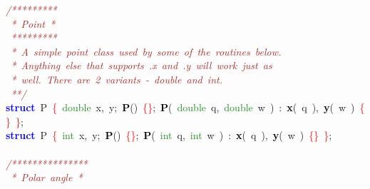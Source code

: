 
{\ttfamily \raggedright {
\noindent
\mbox{}\textit{\textcolor{Brown}{/*********}} \\
\mbox{}\textit{\textcolor{Brown}{\ *\ Point\ *}} \\
\mbox{}\textit{\textcolor{Brown}{\ *********}} \\
\mbox{}\textit{\textcolor{Brown}{\ *\ A\ simple\ point\ class\ used\ by\ some\ of\ the\ routines\ below.}} \\
\mbox{}\textit{\textcolor{Brown}{\ *\ Anything\ else\ that\ supports\ .x\ and\ .y\ will\ work\ just\ as}} \\
\mbox{}\textit{\textcolor{Brown}{\ *\ well.\ There\ are\ 2\ variants\ -\ double\ and\ int.}} \\
\mbox{}\textit{\textcolor{Brown}{\ **/}} \\
\mbox{}\textbf{\textcolor{Blue}{struct}}\ P\ \textcolor{Red}{\{}\ \textcolor{ForestGreen}{double}\ x\textcolor{BrickRed}{,}\ y\textcolor{BrickRed}{;}\ \textbf{\textcolor{Black}{P}}\textcolor{BrickRed}{()}\ \textcolor{Red}{\{\}}\textcolor{BrickRed}{;}\ \textbf{\textcolor{Black}{P}}\textcolor{BrickRed}{(}\ \textcolor{ForestGreen}{double}\ q\textcolor{BrickRed}{,}\ \textcolor{ForestGreen}{double}\ w\ \textcolor{BrickRed}{)}\ \textcolor{BrickRed}{:}\ \textbf{\textcolor{Black}{x}}\textcolor{BrickRed}{(}\ q\ \textcolor{BrickRed}{),}\ \textbf{\textcolor{Black}{y}}\textcolor{BrickRed}{(}\ w\ \textcolor{BrickRed}{)}\ \textcolor{Red}{\{\}}\ \textcolor{Red}{\}}\textcolor{BrickRed}{;} \\
\mbox{}\textbf{\textcolor{Blue}{struct}}\ P\ \textcolor{Red}{\{}\ \textcolor{ForestGreen}{int}\ x\textcolor{BrickRed}{,}\ y\textcolor{BrickRed}{;}\ \textbf{\textcolor{Black}{P}}\textcolor{BrickRed}{()}\ \textcolor{Red}{\{\}}\textcolor{BrickRed}{;}\ \textbf{\textcolor{Black}{P}}\textcolor{BrickRed}{(}\ \textcolor{ForestGreen}{int}\ q\textcolor{BrickRed}{,}\ \textcolor{ForestGreen}{int}\ w\ \textcolor{BrickRed}{)}\ \textcolor{BrickRed}{:}\ \textbf{\textcolor{Black}{x}}\textcolor{BrickRed}{(}\ q\ \textcolor{BrickRed}{),}\ \textbf{\textcolor{Black}{y}}\textcolor{BrickRed}{(}\ w\ \textcolor{BrickRed}{)}\ \textcolor{Red}{\{\}}\ \textcolor{Red}{\}}\textcolor{BrickRed}{;} \\
\mbox{} \\
\mbox{}\textit{\textcolor{Brown}{/***************}} \\
\mbox{}\textit{\textcolor{Brown}{\ *\ Polar\ angle\ *}} \\
}}
